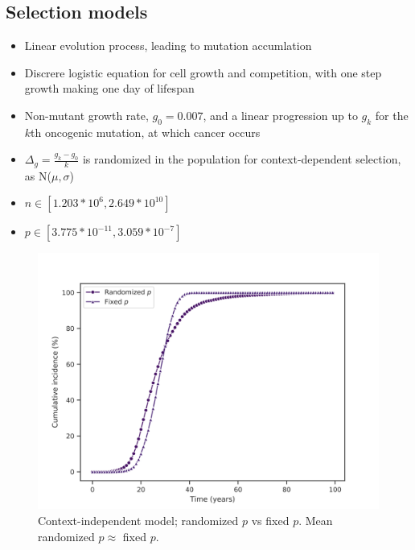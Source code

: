 \documentclass[a0,landscape]{a0poster}
\begin{document}
\begin{multicols}{3}
		\section{Selection models}
		\begin{minipage}{.5\linewidth}
		\begin{itemize}
			\item Linear evolution process, leading to mutation accumlation
			\item Discrere logistic equation for cell growth and competition, with one step growth making one day of lifespan
			\item Non-mutant growth rate, $g_{0}=0.007$, and a linear progression up to $g_{k}$ for the $k$th oncogenic mutation, at which cancer occurs
			\item $\Delta_{g}=\frac{g_{k}-g_{0}}{k}$ is randomized in the population for context-dependent selection, as N($\mu, \sigma$)
			\item $n \in [1.203*10^{6}, 2.649*10^{10}]$
			\item $p \in [3.775*10^{-11}, 3.059*10^{-7}]$
		\end{itemize}
		\end{minipage}
		\hspace{0.05\linewidth}
		\begin{minipage}{.45\linewidth}
			\begin{figure}[H]
				\includegraphics[width=\linewidth]{fig4.png}
				\caption{Context-independent model; randomized $p$ vs fixed $p$. Mean randomized $p \approx$ fixed $p$.}
			\end{figure}
		\end{minipage}


\end{multicols}
\end{document}
